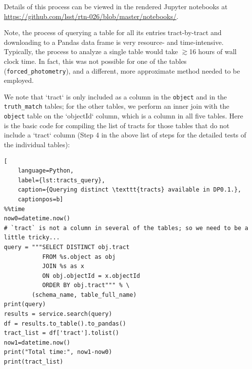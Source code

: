 \documentclass[DM,authoryear,toc]{lsstdoc}
\begin{document}
Details of this process can be viewed in the rendered Jupyter notebooks at
\url{https://github.com/lsst/rtn-026/blob/master/notebooks/}.


Note, the process of querying a table for all its entries
tract-by-tract and downloading to a Pandas data frame is very
resource- and time-intensive.  Typically, the process to analyze a
single table would take $\gtrsim$16 hours of wall clock time.  In
fact, this was not possible for one of the tables
(\texttt{forced\_photometry}), and a different, more approximate
method needed to be employed.

We note that `tract` is only included as a column in the
\texttt{object} and in the \texttt{truth\_match} tables; for the other
tables, we perform an inner join with the \texttt{object} table on the
`objectId` column, which is a column in all five tables.  Here is the
basic code for compiling the list of tracts for those tables that do
not include a `tract` column (Step 4 in the above list of steps for the
detailed tests of the individual tables):
\begin{lstlisting}[
    language=Python,
    label={lst:tracts_query},
    caption={Querying distinct \texttt{tracts} available in DP0.1.},
    captionpos=b]
%%time
now0=datetime.now()
# `tract` is not a column in several of the tables; so we need to be a little tricky...
query = """SELECT DISTINCT obj.tract 
           FROM %s.object as obj
           JOIN %s as x
           ON obj.objectId = x.objectId  
           ORDER BY obj.tract""" % \
        (schema_name, table_full_name)
print(query)
results = service.search(query)
df = results.to_table().to_pandas()
tract_list = df['tract'].tolist()
now1=datetime.now()
print("Total time:", now1-now0)
print(tract_list)
\end{lstlisting}
\end{document}
